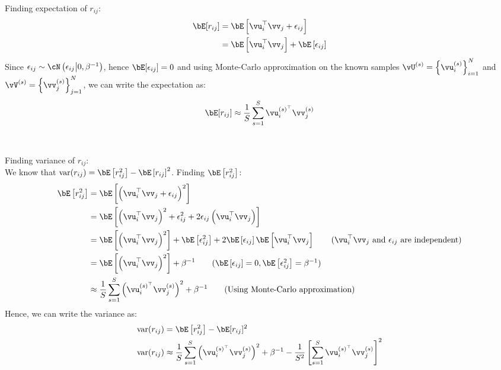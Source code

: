 \documentclass[a4paper,11pt]{article}
\begin{document}
\begin{pmisolution}
\noindent Finding expectation of $r_{ij}$:
\begin{align*}
    \bE[r_{i j}] &= \bE\left[\vu_i^\top \vv_j + \epsilon_{i j}\right] \\
    &= \bE\left[\vu_i^\top \vv_j\right] + \bE\left[\epsilon_{i j}\right]
\end{align*}
Since $\epsilon_{ij} \sim \cN\left(\epsilon_{ij} \middle| 0, \beta^{-1} \right)$, hence $\bE[\epsilon_{ij}] = 0$ and using Monte-Carlo approximation on the known samples $\vU^{(s)} = \left\{\vu_i^{(s)}\right\}_{i=1}^{N}$ and $\vV^{(s)} = \left\{\vv_j^{(s)}\right\}_{j=1}^{N}$, we can write the expectation as:
\begin{equation*}
    \bE[r_{ij}] \approx \frac{1}{S}\sum_{s=1}^{S}\vu_i^{(s)^\top} \vv_j^{(s)}
\end{equation*}
\\ \\
\noindent Finding variance of $r_{ij}$:\\
We know that $\text{var}(r_{ij}) = \bE\left[r_{ij}^2\right] - \bE\left[r_{ij}\right]^2$. Finding $\bE\left[r_{ij}^2\right]$:
\begin{align*}
    \bE\left[r_{ij}^2\right] &= \bE\left[\left(\vu_i^\top \vv_j + \epsilon_{i j}\right)^2\right] \\
    &= \bE\left[\left(\vu_i^\top \vv_j\right)^2 + \epsilon_{i j}^2 + 2\epsilon_{i j}\left(\vu_i^\top \vv_j\right)\right] \\
    &= \bE\left[\left(\vu_i^\top \vv_j\right)^2\right] + \bE\left[\epsilon_{i j}^2\right] + 2\bE\left[\epsilon_{i j}\right]\bE\left[\vu_i^\top \vv_j\right]  \tag{$\vu_i^\top \vv_j$ and $\epsilon_{i j}$ are independent}\\
    &= \bE\left[\left(\vu_i^\top \vv_j\right)^2\right] + \beta^{-1} \tag{$\bE\left[\epsilon_{i j}\right] = 0 , \bE\left[\epsilon_{i j}^2\right] = \beta^{-1}$}\\
    &\approx \frac{1}{S}\sum_{s=1}^S \left(\vu_i^{(s)^\top} \vv_j^{(s)}\right)^2 + \beta^{-1} \tag{Using Monte-Carlo approximation}
\end{align*}
Hence, we can write the variance as:
\begin{align*}
    \text{var}(r_{i j}) &= \bE\left[r_{ij}^2\right] - \bE[r_{i j}]^2\\
    \text{var}(r_{i j}) &\approx \frac{1}{S}\sum_{s=1}^S \left(\vu_i^{(s)^\top} \vv_j^{(s)}\right)^2 + \beta^{-1} - \frac{1}{S^2}\left[\sum_{s=1}^S \vu_i^{(s)^\top} \vv_j^{(s)}\right]^2
\end{align*}
\end{pmisolution}
\end{document}
